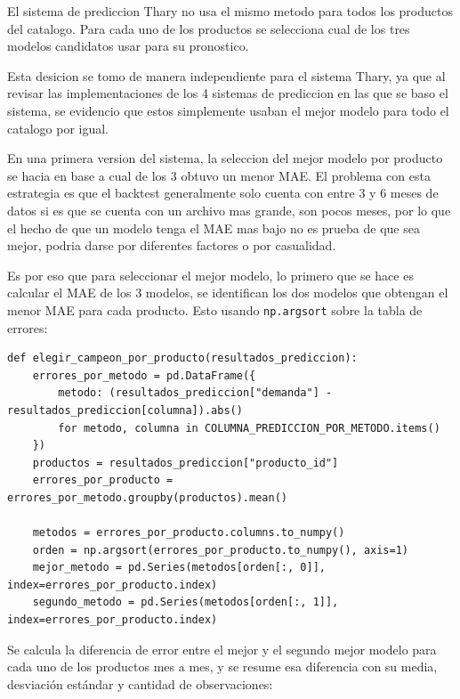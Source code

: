 El sistema de prediccion Thary no usa el mismo metodo para todos los productos del catalogo. Para cada uno de los productos se selecciona cual de los tres modelos candidatos usar para su pronostico. 

Esta desicion se tomo de manera independiente para el sistema Thary, ya que al revisar las implementaciones de los 4 sistemas de prediccion en las que se baso el sistema, se evidencio que estos simplemente usaban el mejor modelo para todo el catalogo por igual.

En una primera version del sistema, la seleccion del mejor modelo por producto se hacia en base a cual de los 3 obtuvo un menor MAE. El problema con esta estrategia es que el backtest generalmente solo cuenta con entre 3 y 6 meses de datos si es que se cuenta con un archivo mas grande, son pocos meses, por lo que el hecho de que un modelo tenga el MAE mas bajo no es prueba de que sea mejor, podria darse por diferentes factores o por casualidad. 

Es por eso que para seleccionar el mejor modelo, lo primero que se hace es calcular el MAE de los 3 modelos, se identifican los dos modelos que obtengan el menor MAE para cada producto. Esto usando \texttt{np.argsort} sobre la tabla de errores:

\label{lst:campeon_mejores}
\begin{verbatim}
def elegir_campeon_por_producto(resultados_prediccion):
    errores_por_metodo = pd.DataFrame({
        metodo: (resultados_prediccion["demanda"] - resultados_prediccion[columna]).abs()
        for metodo, columna in COLUMNA_PREDICCION_POR_METODO.items()
    })
    productos = resultados_prediccion["producto_id"]
    errores_por_producto = errores_por_metodo.groupby(productos).mean()

    metodos = errores_por_producto.columns.to_numpy()
    orden = np.argsort(errores_por_producto.to_numpy(), axis=1)
    mejor_metodo = pd.Series(metodos[orden[:, 0]], index=errores_por_producto.index)
    segundo_metodo = pd.Series(metodos[orden[:, 1]], index=errores_por_producto.index)
\end{verbatim}

Se calcula la diferencia de error entre el mejor y el segundo mejor modelo para cada uno de los productos mes a mes, y se resume esa diferencia con su media, desviación estándar y cantidad de observaciones:

